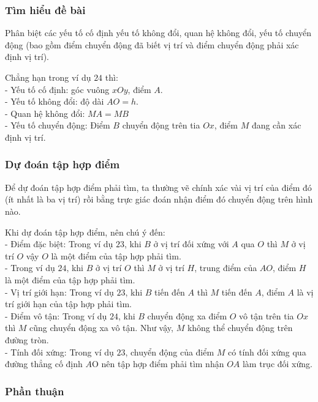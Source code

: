 \subsubsection{Tìm hiểu đề bài}
	Phân biệt các yếu tố cố định yếu tố không đổi, quan hệ không đổi, yếu tố chuyển động (bao gồm điểm chuyển động đã biết vị trí và điểm chuyển động phải xác định vị trí).

\begin{note}
	Chẳng hạn trong ví dụ $24$ thì:\\
	- Yếu tố cố định: góc vuông $xOy$, điểm $A$.\\
	- Yếu tố không đổi: độ dài $AO = h$.\\
	- Quan hệ không đổi: $MA = MB$\\
	- Yếu tố chuyển động: Điểm $B$ chuyển động trên tia  $Ox$, điểm $M$ đang cần xác định vị trí.\\
\end{note}
\subsubsection{Dự đoán tập hợp điểm}
	 Để dự đoán tập hợp điểm phải tìm, ta thường vẽ chính xác vài vị trí của điểm đó (ít nhất là ba vị trí) rồi bằng trực giác đoán nhận điểm đó chuyển động trên hình nào.	

\begin{note}
	Khi dự đoán tập hợp điểm, nên chú ý đến:\\
	- Điểm đặc biệt: Trong ví dụ $23$, khi $B$ ở vị trí đối xứng với $A$ qua $O$ thì $M$ ở vị trí $O$ vậy $O$ là một điểm của tập hợp phải tìm. \\
	- Trong ví dụ $24$, khi $B$ ở vị trí $O$ thì $M$ ở vị trí $H$, trung điểm của $AO$, điểm $H$ là một điểm của tập hợp phải tìm.\\
	- Vị trí giới hạn: Trong ví dụ $23$, khi $B$ tiến đến $A$ thì $M$ tiến đến $A$, điểm $A$ là vị trí giới hạn của tập hợp phải tìm.\\
	- Điểm vô tận: Trong ví dụ $24$, khi $B$ chuyển động xa điểm $O$ vô tận trên tia $Ox$ thì $ M$ cũng chuyển động xa vô tận. Như vậy, $M$ không thể chuyển động trên đường tròn.\\
	- Tính đối xứng: Trong ví dụ $23$, chuyển động của điểm $M$ có tính đối xứng qua đường thẳng cố định $A$O nên tập hợp điểm phải tìm nhận $OA$ làm trục đối xứng.\\
\end{note}
\subsubsection{Phần thuận}


